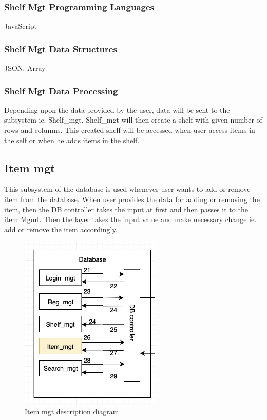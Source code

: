 \subsubsection{Shelf Mgt Programming Languages}
JavaScript

\subsubsection{Shelf Mgt Data Structures}
JSON, Array

\subsubsection{Shelf Mgt Data Processing}
Depending upon the data provided by the user, data will be sent to the subsystem ie. Shelf\_mgt. Shelf\_mgt will then create a shelf with given number of rows and columns. This created shelf will be accessed when user access items in the self or when he adds items in the shelf. 

\subsection{Item mgt}
This subsystem of the database is used whenever user wants to add or remove item from the database. When user provides the data for adding or removing the item, then the DB controller takes the input at first and then passes it to the item Mgmt. Then the layer takes the input value and make necessary change ie. add or remove the item accordingly.

\begin{figure}[h!]
	\centering
 	\includegraphics[width=0.60\textwidth]{images/itemmgt}
 \caption{Item mgt description diagram}
\end{figure}

